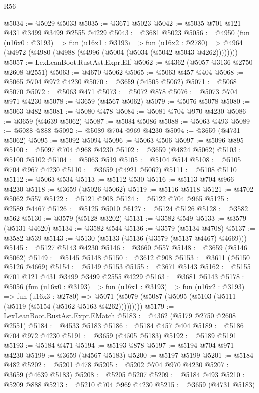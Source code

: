 \begin{lexlean}{R56}
\begin{coremodule}
@5034 := @5029 @5033
@5035 := @3671 @5023
@5042 := @5035 @701 @121 @431 @3499 @3499 @2555 @4229
@5043 := @3681 @5023
@5056 := @4950
    (fun (u16x0 : @3193) =>
    fun (u16x1 : @3193) =>
    fun (u16x2 : @2780) =>
    @4964 (@4972 (@4980 (@4988 (@4996 (@5004 (@5034 (@5042 @5043 @4262))))))))
@5057 := LexLeanBoot.RustAst.Expr.EIf
@5062 := @4362 (@5057 @3136 @2750 @2608 @2551)
@5063 := @4670 @5062
@5065 := @5063 @457 @404
@5068 := @5065 @704 @972 @4230
@5070 := @3659 (@4505 @5062)
@5071 := @5068 @5070
@5072 := @5063 @471
@5073 := @5072 @878
@5076 := @5073 @704 @971 @4230
@5078 := @3659 (@4567 @5062)
@5079 := @5076 @5078
@5080 := @5063 @482
@5081 := @5080 @478
@5084 := @5081 @704 @970 @4230
@5086 := @3659 (@4639 @5062)
@5087 := @5084 @5086
@5088 := @5063 @493
@5089 := @5088 @888
@5092 := @5089 @704 @969 @4230
@5094 := @3659 (@4731 @5062)
@5095 := @5092 @5094
@5096 := @5063 @506
@5097 := @5096 @895
@5100 := @5097 @704 @968 @4230
@5102 := @3659 (@4824 @5062)
@5103 := @5100 @5102
@5104 := @5063 @519
@5105 := @5104 @514
@5108 := @5105 @704 @967 @4230
@5110 := @3659 (@4921 @5062)
@5111 := @5108 @5110
@5112 := @5063 @534
@5113 := @5112 @530
@5116 := @5113 @704 @966 @4230
@5118 := @3659 (@5026 @5062)
@5119 := @5116 @5118
@5121 := @4702 @5062 @557
@5122 := @5121 @908
@5124 := @5122 @704 @965
@5125 := @2589 @4467
@5126 := @5125 @5010
@5127 := @5124 @5126
@5128 := @3582 @562
@5130 := @3579 (@5128 @3202)
@5131 := @3582 @549
@5133 := @3579 (@5131 @4620)
@5134 := @3582 @544
@5136 := @3579 (@5134 @4708)
@5137 := @3582 @539
@5143 := @5130 (@5133 (@5136 (@3579 (@5137 @4467) @4669)))
@5145 := @5127 @5143 @4230
@5146 := @3660 @557
@5148 := @3659 (@5146 @5062)
@5149 := @5145 @5148
@5150 := @3612 @908
@5153 := @3611 (@5150 @5126 @4669)
@5154 := @5149 @5153
@5155 := @3671 @5143
@5162 := @5155 @701 @121 @431 @3499 @3499 @2555 @4229
@5163 := @3681 @5143
@5178 := @5056
    (fun (u16x0 : @3193) =>
    fun (u16x1 : @3193) =>
    fun (u16x2 : @3193) =>
    fun (u16x3 : @2780) =>
    @5071 (@5079 (@5087 (@5095 (@5103 (@5111 (@5119 (@5154 (@5162 @5163 @4262)))))))))
@5179 := LexLeanBoot.RustAst.Expr.EMatch
@5183 := @4362 (@5179 @2750 @2608 @2551)
@5184 := @4533 @5183
@5186 := @5184 @457 @404
@5189 := @5186 @704 @972 @4230
@5191 := @3659 (@4505 @5183)
@5192 := @5189 @5191
@5193 := @5184 @471
@5194 := @5193 @878
@5197 := @5194 @704 @971 @4230
@5199 := @3659 (@4567 @5183)
@5200 := @5197 @5199
@5201 := @5184 @482
@5202 := @5201 @478
@5205 := @5202 @704 @970 @4230
@5207 := @3659 (@4639 @5183)
@5208 := @5205 @5207
@5209 := @5184 @493
@5210 := @5209 @888
@5213 := @5210 @704 @969 @4230
@5215 := @3659 (@4731 @5183)

\end{coremodule}
\end{lexlean}
